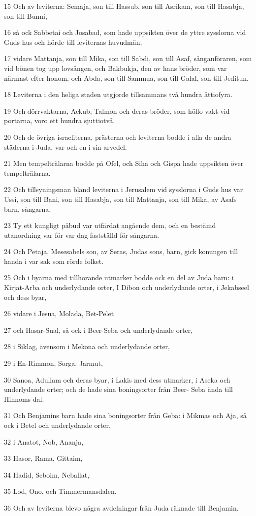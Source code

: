 \par 15 Och av leviterna: Semaja, son till Hassub, son till Asrikam, son till Hasabja, son till Bunni,
\par 16 så ock Sabbetai och Josabad, som hade uppsikten över de yttre sysslorna vid Guds hus och hörde till leviternas huvudmän,
\par 17 vidare Mattanja, son till Mika, son till Sabdi, son till Asaf, sånganföraren, som vid bönen tog upp lovsången, och Bakbukja, den av hans bröder, som var närmast efter honom, och Abda, son till Sammua, son till Galal, son till Jeditun.
\par 18 Leviterna i den heliga staden utgjorde tillsammans två hundra åttiofyra.
\par 19 Och dörrvaktarna, Ackub, Talmon och deras bröder, som höllo vakt vid portarna, voro ett hundra sjuttiotvå.
\par 20 Och de övriga israeliterna, prästerna och leviterna bodde i alla de andra städerna i Juda, var och en i sin arvedel.
\par 21 Men tempelträlarna bodde på Ofel, och Siha och Gispa hade uppsikten över tempelträlarna.
\par 22 Och tillsyningsman bland leviterna i Jerusalem vid sysslorna i Guds hus var Ussi, son till Bani, son till Hasabja, son till Mattanja, son till Mika, av Asafs barn, sångarna.
\par 23 Ty ett kungligt påbud var utfärdat angående dem, och en bestämd utanordning var för var dag fastställd för sångarna.
\par 24 Och Petaja, Mesesabels son, av Seras, Judas sons, barn, gick konungen till handa i var sak som rörde folket.
\par 25 Och i byarna med tillhörande utmarker bodde ock en del av Juda barn: i Kirjat-Arba och underlydande orter, I Dibon och underlydande orter, i Jekabseel och dess byar,
\par 26 vidare i Jesua, Molada, Bet-Pelet
\par 27 och Hasar-Sual, så ock i Beer-Seba och underlydande orter,
\par 28 i Siklag, ävensom i Mekona och underlydande orter,
\par 29 i En-Rimmon, Sorga, Jarmut,
\par 30 Sanoa, Adullam och deras byar, i Lakis med dess utmarker, i Aseka och underlydande orter; och de hade sina boningsorter från Beer- Seba ända till Hinnoms dal.
\par 31 Och Benjamins barn hade sina boningsorter från Geba: i Mikmas och Aja, så ock i Betel och underlydande orter,
\par 32 i Anatot, Nob, Ananja,
\par 33 Hasor, Rama, Gittaim,
\par 34 Hadid, Seboim, Neballat,
\par 35 Lod, Ono, och Timmermansdalen.
\par 36 Och av leviterna blevo några avdelningar från Juda räknade till Benjamin.


